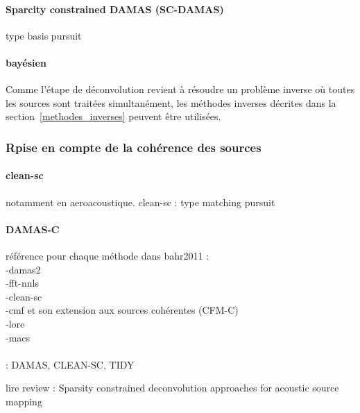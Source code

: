 \paragraph{Sparcity constrained DAMAS (SC-DAMAS)}
\cite{Yardibi2008}

type basis pursuit

\paragraph{bayésien}


Comme l'étape de déconvolution revient à résoudre un problème inverse où toutes les sources sont traitées simultanément, les méthodes inverses décrites dans la section~\ref{methodes_inverses} peuvent être utilisées.


\subsubsection{Rpise en compte de la cohérence des sources}
\paragraph{clean-sc}
notamment en aeroacoustique.
clean-sc : type matching pursuit

\paragraph{DAMAS-C}





référence pour chaque méthode dans bahr2011 : \\
-damas2\\

-fft-nnls\\

-clean-sc\\

-cmf et son extension aux sources cohérentes (CFM-C)\\

-lore\\

-macs\\


~\\  : DAMAS, CLEAN-SC, TIDY

lire review : Sparsity constrained deconvolution approaches for acoustic
source mapping


